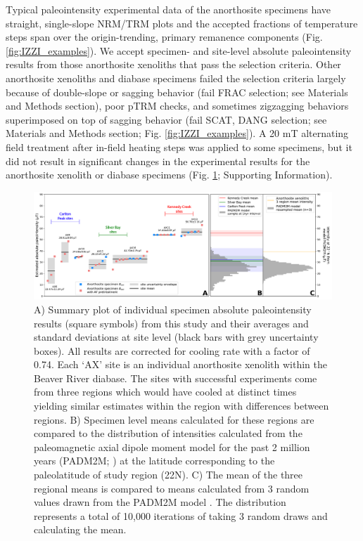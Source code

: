 \documentclass[9pt,twocolumn,twoside,lineno]{pnas-new}
\begin{document}
Typical paleointensity experimental data of the anorthosite specimens have straight, single-slope NRM/TRM plots and the accepted fractions of temperature steps span over the origin-trending, primary remanence components (Fig. \ref{fig:IZZI_examples}). We accept specimen- and site-level absolute paleointensity results from those anorthosite xenoliths that pass the selection criteria. Other anorthosite xenoliths and diabase specimens failed the selection criteria largely because of double-slope or sagging behavior (fail FRAC selection; see Materials and Methods section), poor pTRM checks, and sometimes zigzagging behaviors superimposed on top of sagging behavior (fail SCAT, DANG selection; see Materials and Methods section; Fig. \ref{fig:IZZI_examples}). A 20 mT alternating field treatment after in-field heating steps was applied to some specimens, but it did not result in significant changes in the experimental results for the anorthosite xenolith or diabase specimens (Fig. \ref{fig:PINT_cooling_corrected}; Supporting Information). 

\begin{figure}[h!]
\noindent\includegraphics[width=17.8 cm]{Paleointensity_plot_cooling_corrected.pdf}
\centering
\caption{\footnotesize{A) Summary plot of individual specimen absolute paleointensity results (square symbols) from this study and their averages and standard deviations at site level (black bars with grey uncertainty boxes). All results are corrected for cooling rate with a factor of 0.74. Each `AX' site is an individual anorthosite xenolith within the Beaver River diabase. The sites with successful experiments come from three regions which would have cooled at distinct times yielding similar estimates within the region with differences between regions. B) Specimen level means calculated for these regions are compared to the distribution of intensities calculated from the paleomagnetic axial dipole moment model for the past 2 million years (PADM2M; \citealp{Ziegler2011a}) at the latitude corresponding to the paleolatitude of study region (22\textdegree N). C) The mean of the three regional means is compared to means calculated from 3 random values drawn from the PADM2M model \cite{Ziegler2011a}. The distribution represents a total of 10,000 iterations of taking 3 random draws and calculating the mean. }}
\label{fig:PINT_cooling_corrected}
\end{figure}
\end{document}
